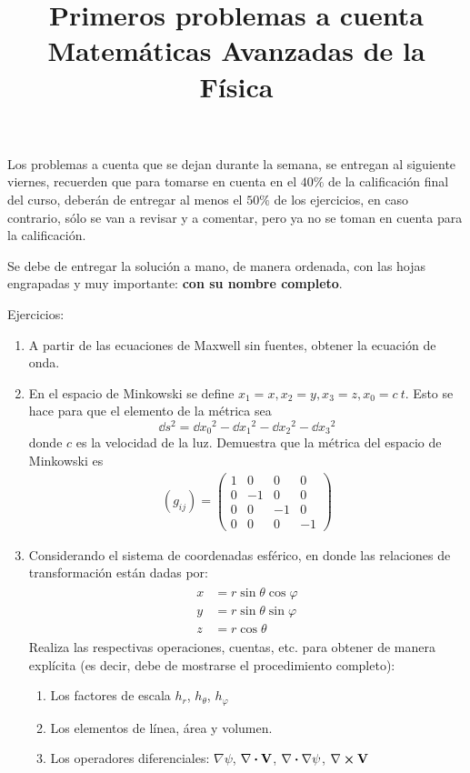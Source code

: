 
\usepackage[top=2cm, bottom=2cm, left=1.5cm, right=1.5cm,headsep=0pt]{geometry}
\title{Primeros problemas a cuenta \\ {\large Matemáticas Avanzadas de la Física}}
\date{ }

\renewcommand\labelenumii{\theenumi.{\arabic{enumii}}}
\maketitle
\fontsize{14}{14}\selectfont
Los problemas a cuenta que se dejan durante la semana, se entregan al siguiente viernes, recuerden que para tomarse en cuenta en el $40\%$ de la calificación final del curso, deberán de entregar al menos el $50\%$ de los ejercicios, en caso contrario, sólo se van a revisar y a comentar, pero ya no se toman en cuenta para la calificación.
\par
Se debe de entregar la solución a mano, de manera ordenada, con las hojas engrapadas y muy importante: \textbf{con su nombre completo}.
\par
Ejercicios:
\begin{enumerate}
\item A partir de las ecuaciones de Maxwell sin fuentes, obtener la ecuación de onda.
\item En el espacio de Minkowski se define $x_{1} = x, x_{2} = y, x_{3} = z, x_{0} = c \: t$. Esto se hace para que el elemento de la métrica sea 
\[ \dd{s^{2}} = \dd{x_{0}}^{2} - \dd{x_{1}}^{2} - \dd{x_{2}}^{2} - \dd{x_{3}}^{2} \]
donde $c$ es la velocidad de la luz. Demuestra que la métrica del espacio de Minkowski es
\begin{align*}
(g_{ij}) = \begin{pmatrix}
1 & 0 & 0 & 0 \\
0 & -1 & 0 & 0 \\
0 & 0 & -1 & 0 \\
0 & 0 & 0 & -1
\end{pmatrix}
\end{align*}
\item Considerando el sistema de coordenadas esférico, en donde las relaciones de transformación están dadas por:
\begin{align*}
\begin{aligned}
x &= r \sin \theta \cos \varphi \\
y &= r \sin \theta \sin \varphi \\
z &= r \cos \theta
\end{aligned}
\end{align*}
Realiza las respectivas operaciones, cuentas, etc. para obtener de manera explícita (es decir, debe de mostrarse el procedimiento completo):
\begin{enumerate}
\item Los factores de escala $h_{r}$, $h_{\theta}$, $h_{\varphi}$
\item Los elementos de línea, área y volumen.
\item Los operadores diferenciales: $\nabla \psi$, $\nabla \vdot \vb{V}$, $\nabla \vdot \nabla \psi$, $\nabla \cp \vb{V}$  
\end{enumerate}
\end{enumerate}

